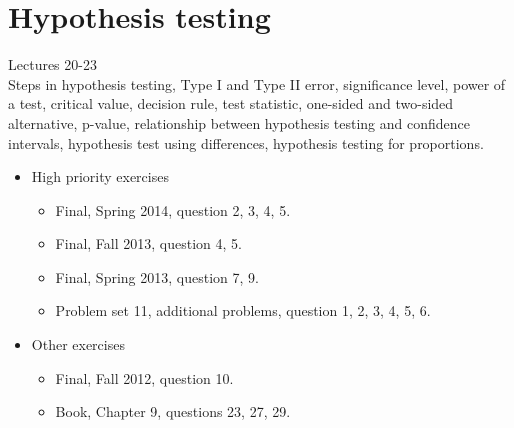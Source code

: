 \documentclass[11pt]{article}
\begin{document}
\section{Hypothesis testing}
Lectures 20-23\\[0.2in]
Steps in hypothesis testing, Type I and Type II error, significance level, power of a test, critical value, decision rule, test statistic, one-sided and two-sided alternative, p-value, relationship between hypothesis testing and confidence intervals, hypothesis test using differences, hypothesis testing for proportions.
\begin{itemize}
	\item High priority exercises
		\begin{itemize}
			\item Final, Spring 2014, question 2, 3, 4, 5.
			\item Final, Fall 2013, question 4, 5.
			\item Final, Spring 2013, question 7, 9.
			\item Problem set 11, additional problems, question 1, 2, 3, 4, 5, 6.
		\end{itemize}
	\item Other exercises
	\begin{itemize}
		\item Final, Fall 2012, question 10. 
		\item Book, Chapter 9, questions 23, 27, 29.
	\end{itemize}
\end{itemize}
\end{document}
